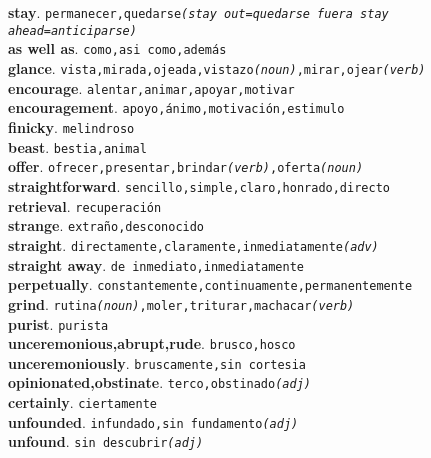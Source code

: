 \documentclass[twocolumn]{article}
\begin{document}
	\textsf{\textbf{stay}}. \texttt{permanecer,quedarse{\scriptsize \textsl{(stay out=quedarse fuera stay ahead=anticiparse)}}}\\
	\textsf{\textbf{as well as}}. \texttt{como,asi como,adem\'as}\\
	\textsf{\textbf{glance}}. \texttt{vista,mirada,ojeada,vistazo{\scriptsize \textsl{(noun)}},mirar,ojear{\scriptsize \textsl{(verb)}}}\\
	\textsf{\textbf{encourage}}. \texttt{alentar,animar,apoyar,motivar}\\
	\textsf{\textbf{encouragement}}. \texttt{apoyo,\'animo,motivaci\'on,estimulo}\\
	\textsf{\textbf{finicky}}. \texttt{melindroso}\\
	\textsf{\textbf{beast}}. \texttt{bestia,animal}\\
	\textsf{\textbf{offer}}. \texttt{ofrecer,presentar,brindar{\scriptsize \textsl{(verb)}},oferta{\scriptsize \textsl{(noun)}}}\\
	\textsf{\textbf{straightforward}}. \texttt{sencillo,simple,claro,honrado,directo}\\
	\textsf{\textbf{retrieval}}. \texttt{recuperaci\'on}\\
	\textsf{\textbf{strange}}. \texttt{extra\~no,desconocido}\\
	\textsf{\textbf{straight}}. \texttt{directamente,claramente,inmediatamente{\scriptsize \textsl{(adv)}}}\\
	\textsf{\textbf{straight away}}. \texttt{de inmediato,inmediatamente}\\
	\textsf{\textbf{perpetually}}. \texttt{constantemente,continuamente,permanentemente}\\
	\textsf{\textbf{grind}}. \texttt{rutina{\scriptsize \textsl{(noun)}},moler,triturar,machacar{\scriptsize \textsl{(verb)}}}\\
	\textsf{\textbf{purist}}. \texttt{purista}\\
	\textsf{\textbf{unceremonious,abrupt,rude}}. \texttt{brusco,hosco}\\
	\textsf{\textbf{unceremoniously}}. \texttt{bruscamente,sin cortesia}\\
	\textsf{\textbf{opinionated,obstinate}}. \texttt{terco,obstinado{\scriptsize \textsl{(adj)}}}\\
	\textsf{\textbf{certainly}}. \texttt{ciertamente}\\
	\textsf{\textbf{unfounded}}. \texttt{infundado,sin fundamento{\scriptsize \textsl{(adj)}}}\\
	\textsf{\textbf{unfound}}. \texttt{sin descubrir{\scriptsize \textsl{(adj)}}}\\
\end{document}
